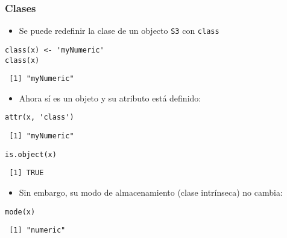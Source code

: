 \documentclass[xcolor={usenames,svgnames,dvipsnames}]{beamer}
\begin{document}
\begin{frame}[fragile]
\frametitle{Clases}
\label{sec-2-1-2}

\begin{itemize}
\item Se puede redefinir la clase de un objecto \texttt{S3} con \texttt{class}
\end{itemize}

\lstset{language=R}
\begin{lstlisting}
class(x) <- 'myNumeric'
class(x)
\end{lstlisting}

\begin{verbatim}
 [1] "myNumeric"
\end{verbatim}

\begin{itemize}
\item Ahora sí es un objeto y su atributo está definido:
\end{itemize}

\lstset{language=R}
\begin{lstlisting}
attr(x, 'class')
\end{lstlisting}

\begin{verbatim}
 [1] "myNumeric"
\end{verbatim}


\lstset{language=R}
\begin{lstlisting}
is.object(x)
\end{lstlisting}

\begin{verbatim}
 [1] TRUE
\end{verbatim}

\begin{itemize}
\item Sin embargo, su modo de almacenamiento (clase intrínseca) no cambia:
\end{itemize}

\lstset{language=R}
\begin{lstlisting}
mode(x)
\end{lstlisting}

\begin{verbatim}
 [1] "numeric"
\end{verbatim}
\end{frame}
\end{document}
